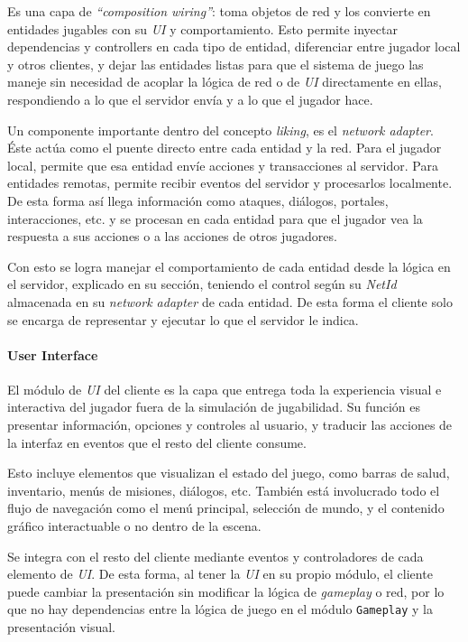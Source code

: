 Es una capa de \textit{“composition wiring”}: toma objetos de red y los convierte en entidades 
jugables con su \textit{UI} y comportamiento. Esto permite inyectar dependencias y controllers en cada tipo 
de entidad, diferenciar entre jugador local y otros clientes, y dejar las entidades listas para que el sistema 
de juego las maneje sin necesidad de acoplar la lógica de red o de \textit{UI} directamente en ellas, respondiendo 
a lo que el servidor envía y a lo que el jugador hace.

\vspace{0.20cm}

Un componente importante dentro del concepto \textit{liking}, es el \textit{network adapter}. Éste actúa como 
el puente directo entre cada entidad y la red. Para el jugador local, permite que esa entidad envíe acciones y 
transacciones al servidor. Para entidades remotas, permite recibir eventos del servidor y procesarlos localmente.
De esta forma así llega información como ataques, diálogos, portales, interacciones, etc. y se procesan en 
cada entidad para que el jugador vea la respuesta a sus acciones o a las acciones de otros jugadores.

Con esto se logra manejar el comportamiento de cada entidad desde la lógica en el servidor, explicado en su sección, 
teniendo el control según su \textit{NetId} almacenada en su \textit{network adapter} de cada entidad.
De esta forma el cliente solo se encarga de representar y ejecutar lo que el servidor le indica.

\paragraph{User Interface}

El módulo de \textit{UI} del cliente es la capa que entrega toda la experiencia visual e interactiva del jugador 
fuera de la simulación de jugabilidad. Su función es presentar información, opciones y controles al 
usuario, y traducir las acciones de la interfaz en eventos que el resto del cliente consume.

Esto incluye elementos que visualizan el estado del juego, como barras de salud, inventario, 
menús de misiones, diálogos, etc. También está involucrado todo el flujo de navegación como el menú principal, 
selección de mundo, y el contenido gráfico interactuable o no dentro de la escena.

Se integra con el resto del cliente mediante eventos y controladores de cada elemento de \textit{UI}. De esta forma, 
al tener la \textit{UI} en su propio módulo, el cliente puede cambiar la presentación sin modificar la lógica de 
\textit{gameplay} o red, por lo que no hay dependencias entre la lógica de juego en el módulo \texttt{Gameplay} 
y la presentación visual.

